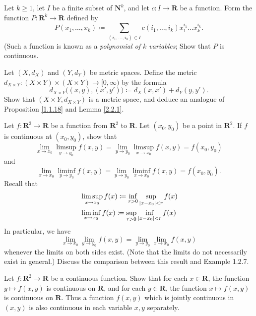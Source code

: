 \begin{exercise}\label{ex 2.2.7}
    Let \(k \geq 1\), let \(I\) be a finite subset of \(\mathbf{N}^k\), and let \(c : I \to \mathbf{R}\) be a function.
    Form the function \(P : \mathbf{R}^k \to \mathbf{R}\) defined by
    \[
        P(x_1, \dots, x_k) \coloneqq \sum_{(i_1, \dots, i_k) \in I} c(i_1, \dots, i_k) x_1^{i_1} \dots x_k^{i_k}.
    \]
    (Such a function is known as a \emph{polynomial of \(k\) variables};
    Show that \(P\) is continuous.
\end{exercise}

\begin{exercise}\label{ex 2.2.8}
    Let \((X, d_X)\) and \((Y, d_Y)\) be metric spaces.
    Define the metric \(d_{X \times Y} : (X \times Y) \times (X \times Y) \to [0, \infty)\) by the formula
    \[
        d_{X \times Y}\big((x, y), (x', y')\big) \coloneqq d_X(x, x') + d_Y(y, y').
    \]
    Show that \((X \times Y, d_{X \times Y})\) is a metric space, and deduce an analogue of Proposition \ref{1.1.18} and Lemma \ref{2.2.1}.
\end{exercise}

\begin{exercise}\label{ex 2.2.9}
    Let \(f : \mathbf{R}^2 \to \mathbf{R}\) be a function from \(\mathbf{R}^2\) to \(\mathbf{R}\).
    Let \((x_0, y_0)\) be a point in \(\mathbf{R}^2\).
    If \(f\) is continuous at \((x_0, y_0)\), show that
    \[
        \lim_{x \to x_0} \limsup_{y \to y_0} f(x, y) = \lim_{y \to y_0} \limsup_{x \to x_0} f(x, y) = f(x_0, y_0)
    \]
    and
    \[
        \lim_{x \to x_0} \liminf_{y \to y_0} f(x, y) = \lim_{y \to y_0} \liminf_{x \to x_0} f(x, y) = f(x_0, y_0).
    \]
    Recall that
    \begin{align*}
         & \limsup_{x \to x_0} f(x) \coloneqq \inf_{r > 0} \sup_{\abs*{x - x_0} < r} f(x) \\
         & \liminf_{x \to x_0} f(x) \coloneqq \sup_{r > 0} \inf_{\abs*{x - x_0} < r} f(x)
    \end{align*}
    In particular, we have
    \[
        \lim_{x \to x_0} \lim_{y \to y_0} f(x, y) = \lim_{y \to y_0} \lim_{x \to x_0} f(x, y)
    \]
    whenever the limits on both sides exist.
    (Note that the limits do not necessarily exist in general.)
    Discuss the comparison between this result and Example 1.2.7.
\end{exercise}

\begin{exercise}\label{ex 2.2.10}
    Let \(f : \mathbf{R}^2 \to \mathbf{R}\) be a continuous function.
    Show that for each \(x \in \mathbf{R}\), the function \(y \mapsto f(x, y)\) is continuous on \(\mathbf{R}\), and for each \(y \in \mathbf{R}\), the function \(x \mapsto f(x, y)\) is continuous on \(\mathbf{R}\).
    Thus a function \(f(x, y)\) which is jointly continuous in \((x, y)\) is also continuous in each variable \(x, y\) separately.
\end{exercise}

